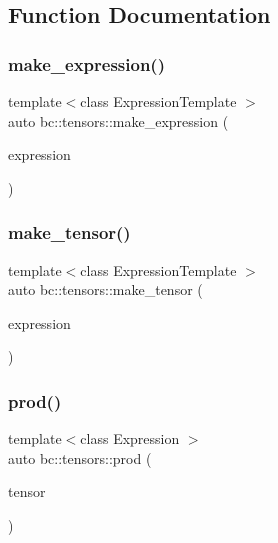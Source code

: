 \subsection{Function Documentation}
\mbox{\label{namespacebc_1_1tensors_a9340c1c54caa73ef6af71c5f7d378d07}} 
\subsubsection{\texorpdfstring{make\+\_\+expression()}{make\_expression()}}
{\footnotesize\ttfamily template$<$class Expression\+Template $>$ \\
auto bc\+::tensors\+::make\+\_\+expression (\begin{DoxyParamCaption}\item[{Expression\+Template}]{expression }\end{DoxyParamCaption})}

\mbox{\label{namespacebc_1_1tensors_a233ba24319d0e30ec3026f1643f8facb}} 
\subsubsection{\texorpdfstring{make\+\_\+tensor()}{make\_tensor()}}
{\footnotesize\ttfamily template$<$class Expression\+Template $>$ \\
auto bc\+::tensors\+::make\+\_\+tensor (\begin{DoxyParamCaption}\item[{Expression\+Template}]{expression }\end{DoxyParamCaption})}

\mbox{\label{namespacebc_1_1tensors_adc4bc353674317539fe28f7a8e13a515}} 
\subsubsection{\texorpdfstring{prod()}{prod()}}
{\footnotesize\ttfamily template$<$class Expression $>$ \\
auto bc\+::tensors\+::prod (\begin{DoxyParamCaption}\item[{const \hyperlink{classbc_1_1tensors_1_1Expression__Base}{Expression\+\_\+\+Base}$<$ Expression $>$ \&}]{tensor }\end{DoxyParamCaption})}

